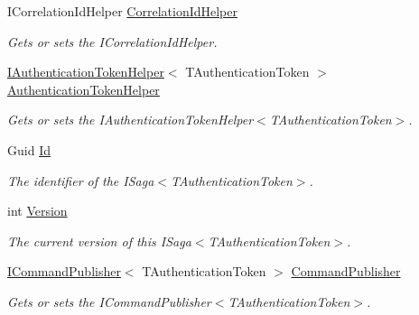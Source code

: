 \begin{DoxyCompactItemize}
I\+Correlation\+Id\+Helper \hyperlink{classCqrs_1_1Akka_1_1Domain_1_1AkkaSaga_a11d543b42aa6e55644c2b349336e962a_a11d543b42aa6e55644c2b349336e962a}{Correlation\+Id\+Helper}
\begin{DoxyCompactList}\small\item\em Gets or sets the I\+Correlation\+Id\+Helper. \end{DoxyCompactList}\item 
\hyperlink{interfaceCqrs_1_1Authentication_1_1IAuthenticationTokenHelper}{I\+Authentication\+Token\+Helper}$<$ T\+Authentication\+Token $>$ \hyperlink{classCqrs_1_1Akka_1_1Domain_1_1AkkaSaga_a18e4d7faa9cd9d10ac2ac0bd3b6c9fc9_a18e4d7faa9cd9d10ac2ac0bd3b6c9fc9}{Authentication\+Token\+Helper}
\begin{DoxyCompactList}\small\item\em Gets or sets the I\+Authentication\+Token\+Helper$<$\+T\+Authentication\+Token$>$. \end{DoxyCompactList}\item 
Guid \hyperlink{classCqrs_1_1Akka_1_1Domain_1_1AkkaSaga_a98fa8a5ebc587bc02b1c98d5ffbc997e_a98fa8a5ebc587bc02b1c98d5ffbc997e}{Id}
\begin{DoxyCompactList}\small\item\em The identifier of the I\+Saga$<$\+T\+Authentication\+Token$>$. \end{DoxyCompactList}\item 
int \hyperlink{classCqrs_1_1Akka_1_1Domain_1_1AkkaSaga_a3fda31a3857e12a1aed60f4a4f04edd1_a3fda31a3857e12a1aed60f4a4f04edd1}{Version}
\begin{DoxyCompactList}\small\item\em The current version of this I\+Saga$<$\+T\+Authentication\+Token$>$. \end{DoxyCompactList}\item 
\hyperlink{interfaceCqrs_1_1Commands_1_1ICommandPublisher}{I\+Command\+Publisher}$<$ T\+Authentication\+Token $>$ \hyperlink{classCqrs_1_1Akka_1_1Domain_1_1AkkaSaga_ac00968d1d69d89d46b43af10fc0d4510_ac00968d1d69d89d46b43af10fc0d4510}{Command\+Publisher}
\begin{DoxyCompactList}\small\item\em Gets or sets the I\+Command\+Publisher$<$\+T\+Authentication\+Token$>$. \end{DoxyCompactList}\end{DoxyCompactItemize}


